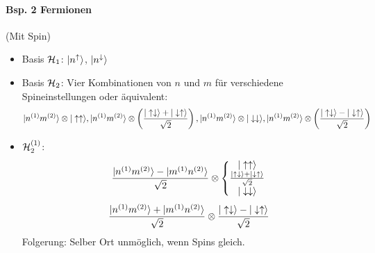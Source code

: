 \documentclass[11pt,a4paper]{report}
\begin{document}
\paragraph{Bsp. 2 Fermionen} (Mit Spin)
\begin{itemize}
\item Basis $\mathcal{H}_1$: $|n^\uparrow\rangle$, $|n^\downarrow\rangle$
\item Basis $\mathcal{H}_2$: Vier Kombinationen von $n$ und $m$ für verschiedene Spineinstellungen oder äquivalent:
$$|n^{(1)}m^{(2)}\rangle\otimes|\uparrow\uparrow\rangle, |n^{(1)}m^{(2)}\rangle\otimes\left(\frac{|\uparrow\downarrow\rangle+|\downarrow\uparrow\rangle}{\sqrt{2}}\right), |n^{(1)}m^{(2)}\rangle\otimes|\downarrow\downarrow\rangle, |n^{(1)}m^{(2)}\rangle\otimes\left(\frac{|\uparrow\downarrow\rangle-|\downarrow\uparrow\rangle}{\sqrt{2}}\right)$$
\item $\mathcal{H}_2^{(1)}$:
$$\frac{|n^{(1)}m^{(2)}\rangle-|m^{(1)}n^{(2)}\rangle}{\sqrt{2}} \otimes\left\{\begin{matrix}
|\uparrow\uparrow\rangle \\ \frac{|\uparrow\downarrow\rangle+|\downarrow\uparrow\rangle}{\sqrt{2}} \\ |\downarrow\downarrow\rangle
\end{matrix}\right.$$
$$ \frac{|n^{(1)}m^{(2)}\rangle+|m^{(1)}n^{(2)}\rangle}{\sqrt{2}}\otimes \frac{|\uparrow\downarrow\rangle-|\downarrow\uparrow\rangle}{\sqrt{2}}$$
Folgerung: Selber Ort unmöglich, wenn Spins gleich.
\end{itemize}
\end{document}

